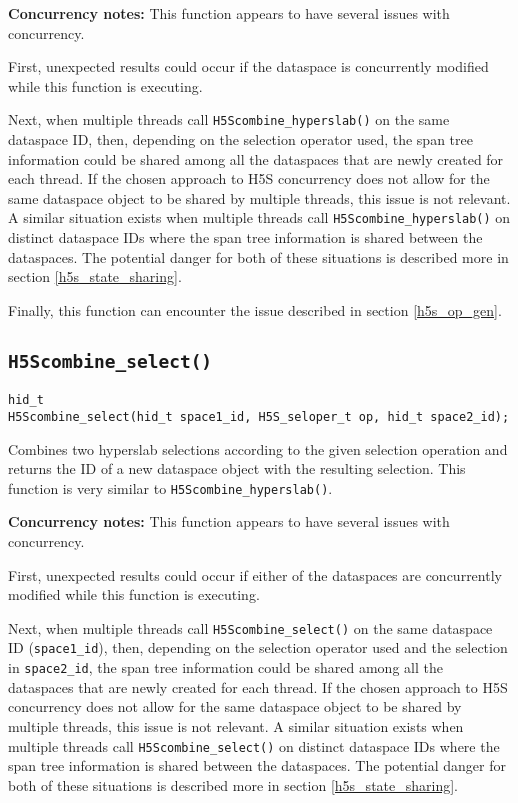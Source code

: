 \documentclass[../HDF5_RFC.tex]{subfiles}
\begin{document}
\textbf{Concurrency notes:} This function appears to have several issues with concurrency.

First, unexpected results could occur if the dataspace is concurrently modified while this
function is executing.

Next, when multiple threads call \texttt{H5Scombine\_hyperslab()} on the same dataspace ID,
then, depending on the selection operator used, the span tree information could be shared
among all the dataspaces that are newly created for each thread. If the chosen approach to
H5S concurrency does not allow for the same dataspace object to be shared by multiple threads,
this issue is not relevant. A similar situation exists when multiple threads call
\texttt{H5Scombine\_hyperslab()} on distinct dataspace IDs where the span tree information
is shared between the dataspaces. The potential danger for both of these situations is
described more in section \ref{h5s_state_sharing}.

Finally, this function can encounter the issue described in section \ref{h5s_op_gen}.

\subsection{\texttt{H5Scombine\_select()}}
\label{apdx:h5s_func_h5scombine_select}

\begin{verbatim}
hid_t
H5Scombine_select(hid_t space1_id, H5S_seloper_t op, hid_t space2_id);
\end{verbatim}

Combines two hyperslab selections according to the given selection operation and returns
the ID of a new dataspace object with the resulting selection. This function is very similar
to \texttt{H5Scombine\_hyperslab()}.

\textbf{Concurrency notes:} This function appears to have several issues with concurrency.

First, unexpected results could occur if either of the dataspaces are concurrently modified
while this function is executing.

Next, when multiple threads call \texttt{H5Scombine\_select()} on the same dataspace ID
(\texttt{space1\_id}), then, depending on the selection operator used and the selection in
\texttt{space2\_id}, the span tree information could be shared among all the dataspaces that
are newly created for each thread. If the chosen approach to H5S concurrency does not allow
for the same dataspace object to be shared by multiple threads, this issue is not relevant.
A similar situation exists when multiple threads call \texttt{H5Scombine\_select()} on
distinct dataspace IDs where the span tree information is shared between the dataspaces.
The potential danger for both of these situations is described more in section
\ref{h5s_state_sharing}.
\end{document}
